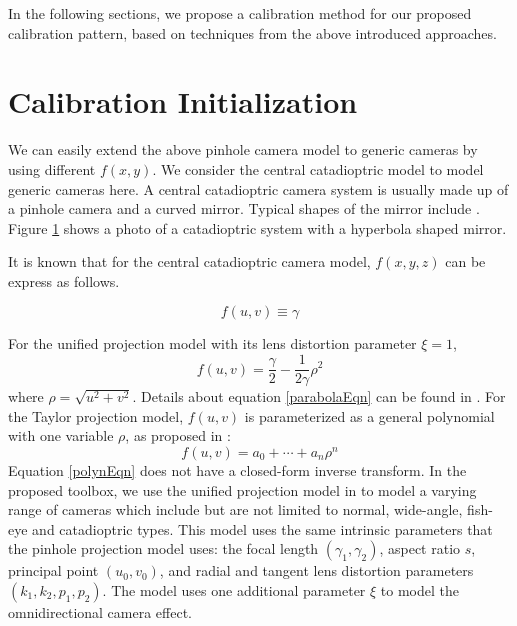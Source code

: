 \documentclass{report}
\begin{document}
In the following sections, we propose a calibration method for our proposed calibration pattern, based on techniques from the above introduced approaches. 

\section{Calibration Initialization}

We can easily extend the above pinhole camera model to generic cameras by using different $f(x, y)$. We consider the central catadioptric model to model generic cameras here. A central catadioptric camera system is usually made up of a pinhole camera and a curved mirror. Typical shapes of the mirror include . Figure \ref{} shows a photo of a catadioptric system with a hyperbola shaped mirror. 

It is known \cite{} that for the central catadioptric camera model, $f(x, y, z)$ can be express as follows. 
\begin{equation}
\end{equation}


\begin{equation}
f(u, v) \equiv \gamma
\label{pinholeEqn}
\end{equation}


For the unified projection model with its lens distortion parameter $\xi = 1$,
\begin{equation}
f(u, v) = \frac{\gamma}{2} - \frac{1}{2 \gamma} \rho^2
\label{parabolaEqn}
\end{equation}
where $\rho = \sqrt{u^2 + v^2}$. Details about equation \ref{parabolaEqn} can be found in \cite{mei2007single}. For the Taylor projection model, $f(u, v)$ is parameterized as a general polynomial with one variable $\rho$, as proposed in \cite{scaramuzza2006toolbox}: 
\begin{equation}
f(u, v) = a_0 + \cdots + a_n \rho^n
\label{polynEqn}
\end{equation}
Equation \ref{polynEqn} does not have a closed-form inverse transform. In the proposed toolbox, we use the unified projection model in \cite{mei2007single} to model a varying range of cameras which include but are not limited to normal, wide-angle, fish-eye and catadioptric types. This model uses the same intrinsic parameters that the pinhole projection model uses: the focal length $(\gamma_1, \gamma_2)$, aspect ratio $s$, principal point $(u_0, v_0)$, and radial and tangent lens distortion parameters $(k_1, k_2, p_1, p_2)$. The model uses one additional parameter $\xi$ to model the omnidirectional camera effect. 
\end{document}
